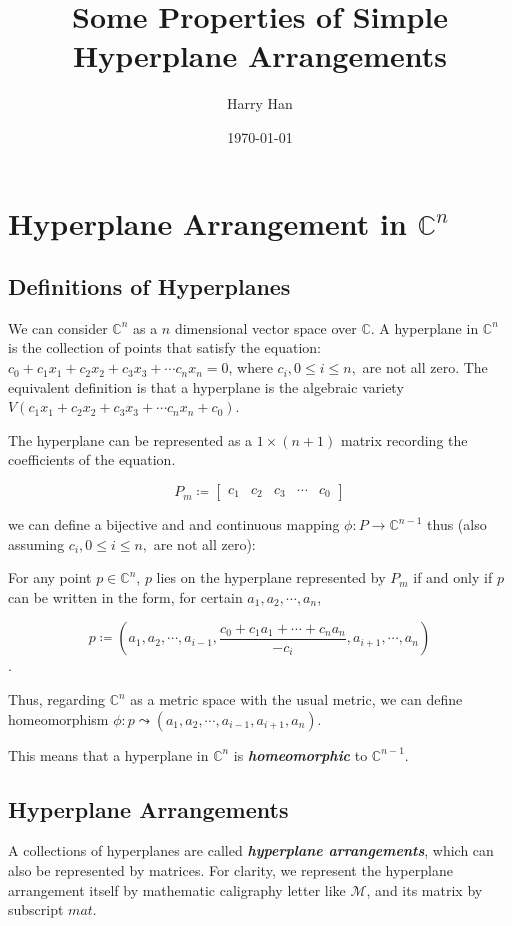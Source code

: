 \documentclass[12pt, a4paper]{article}
\title{Some Properties of Simple Hyperplane Arrangements}
\author{Harry Han}
\date{\today}
\theoremstyle{definition}
\theoremstyle{remark}
\newcommand{\bb}[1]{\mathbb{#1}}
\renewcommand{\emph}[1]{\textit{\textbf{#1}}}
\newcommand{\curly}{\mathrel{\leadsto}}
\begin{document}
\maketitle
\section{Hyperplane Arrangement in $\mathbb{C}^n$}

\subsection{Definitions of Hyperplanes}

We can consider $\bb{C}^n$ as a $n$ dimensional vector space over $\bb{C}$. 
A hyperplane in $\bb{C}^n$ is the collection of points that satisfy the equation: $c_0 + c_1x_1 + c_2x_2 + c_3x_3 + \cdots c_nx_n = 0$, where $c_i, 0 \leq i \leq n, $ are not all zero. The equivalent definition is that a hyperplane is the algebraic variety $V(c_1x_1 + c_2x_2 + c_3x_3 + \cdots c_nx_n + c_0)$. 

The hyperplane can be represented as a $1\times (n+1)$ matrix recording the coefficients of the equation.

$$
P_m \coloneq 
\begin{bmatrix}
	c_1 & c_2 & c_3 & \cdots & c_0
\end{bmatrix}
$$

we can define a bijective and and continuous  mapping $\phi: P \rightarrow  \bb{C}^{n-1}$ thus (also assuming $c_i, 0 \leq i \leq n, $ are not all zero): 

For any point $p \in \bb{C}^n$, $p$ lies on the hyperplane represented by $P_m$ if and only if $p$ can be written in the form, for certain $a_1, a_2, \cdots, a_n$,

$$ p \coloneq (a_1, a_2, \cdots, a_{i-1}, \frac{c_0 + c_1a_1 + \cdots + c_na_n}{-c_i}, a_{i+1}, \cdots, a_n)$$.

Thus, regarding $\mathbb{C}^n$ as a metric space with the usual metric, we can define homeomorphism
$\phi: p \curly (a_1, a_2, \cdots, a_{i-1}, a_{i+1}, a_n)$.

This means that a hyperplane in $\bb{C}^n$ is \emph{homeomorphic} to $\bb{C}^{n-1}$.

\subsection{Hyperplane Arrangements}

A collections of hyperplanes are called \emph{hyperplane arrangements}, which can also be represented by matrices. For clarity, we represent the hyperplane arrangement itself by mathematic caligraphy letter like $\mathcal{M}$, and its matrix by subscript $mat$.
\end{document}
